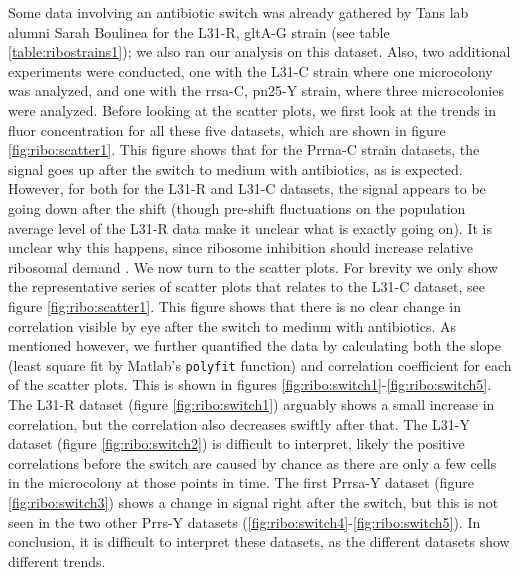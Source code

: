 Some data involving an antibiotic switch was already gathered
by Tans lab alumni Sarah Boulinea for the L31-R, gltA-G strain (see table \ref{table:ribostrains1}); 
we also ran our analysis on this dataset.
Also, two additional experiments were conducted, one with the L31-C strain where one microcolony was analyzed, 
and one with the rrsa-C, pn25-Y strain, where three microcolonies were analyzed.
%
Before looking at the scatter plots, we first look at the 
trends in fluor concentration for all these five datasets, which are shown in figure \ref{fig:ribo:scatter1}.
This figure shows that for the Prrna-C strain datasets, the signal goes up after the switch to medium with antibiotics, as is expected.
However, for both for the L31-R and L31-C datasets, the signal appears to be going down after the shift (though pre-shift fluctuations on the population average level of the L31-R data make it unclear what is exactly going on).
It is unclear why this happens, since ribosome inhibition should increase relative ribosomal demand \cite{You2013}.
%
We now turn to the scatter plots.
For brevity we only show the representative series of scatter plots that relates to the L31-C dataset, see figure \ref{fig:ribo:scatter1}. 
This figure shows that there is no clear change in correlation visible by eye after the switch to medium with antibiotics.
%
As mentioned however, we further quantified the data by calculating both the slope (least square fit by Matlab's \texttt{polyfit} function) and correlation coefficient for each of the scatter plots.
%
This is shown in figures \ref{fig:ribo:switch1}-\ref{fig:ribo:switch5}.
%
The L31-R dataset (figure \ref{fig:ribo:switch1}) arguably shows a small increase in correlation, but the correlation also decreases swiftly after that.
The L31-Y dataset (figure \ref{fig:ribo:switch2}) is difficult to interpret, 
likely the positive correlations before the switch are caused by chance as there are only a few cells in the microcolony at those points in time.
%
The first Prrsa-Y dataset (figure \ref{fig:ribo:switch3}) shows a change in signal right after the switch, but this is not seen in the two other Prrs-Y datasets (\ref{fig:ribo:switch4}-\ref{fig:ribo:switch5}).
%
In conclusion, it is difficult to interpret these datasets, as the different datasets show different trends.


